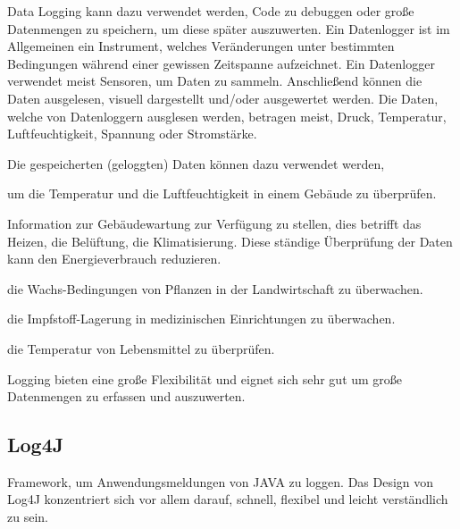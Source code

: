 
Data Logging kann dazu verwendet werden, Code zu debuggen oder große Datenmengen zu speichern, um diese später auszuwerten. Ein Datenlogger ist im Allgemeinen ein Instrument, welches Veränderungen unter bestimmten Bedingungen während einer gewissen Zeitspanne aufzeichnet. Ein Datenlogger verwendet meist Sensoren, um Daten zu sammeln. Anschließend können die Daten ausgelesen, visuell dargestellt und/oder ausgewertet werden. Die Daten, welche von Datenloggern ausglesen werden, betragen meist, Druck, Temperatur, Luftfeuchtigkeit, Spannung oder Stromstärke. 

Die gespeicherten (geloggten) Daten können dazu verwendet werden, 

\begin{compactitem}
    \item um die Temperatur und die Luftfeuchtigkeit in einem Gebäude zu überprüfen.
    \item Information zur Gebäudewartung zur Verfügung zu stellen, dies betrifft das Heizen, die Belüftung, die Klimatisierung. Diese ständige Überprüfung der Daten kann den Energieverbrauch reduzieren.
    \item die Wachs-Bedingungen von Pflanzen in der Landwirtschaft zu überwachen. 
    \item die Impfstoff-Lagerung in medizinischen Einrichtungen zu überwachen. 
    \item die Temperatur von Lebensmittel zu überprüfen.
\end{compactitem}

Logging bieten eine große Flexibilität und eignet sich sehr gut um große Datenmengen zu erfassen und auszuwerten. 

\subsection{Log4J}
Framework, um Anwendungsmeldungen von JAVA zu loggen.
Das Design von Log4J konzentriert sich vor allem darauf, schnell, flexibel und leicht verständlich zu sein. 

